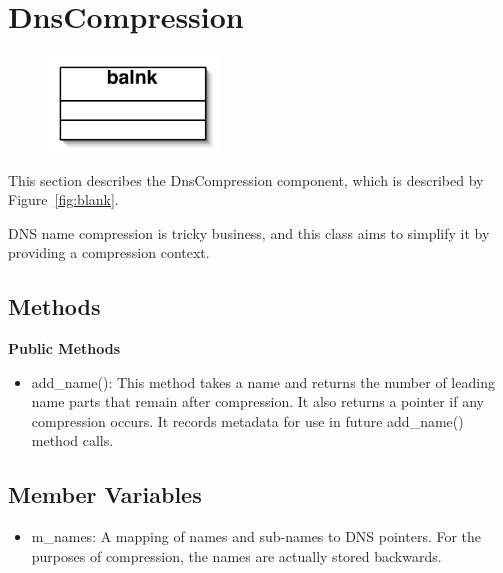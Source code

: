 \section{DnsCompression}\label{sec:dnscomp}

\begin{figure}
\begin{center}
\includegraphics[width=0.4\textwidth]{figs/blank}
\end{center}
\caption{}
\label{fig:dnscomp}
\end{figure}

This section describes the DnsCompression component, which is described by Figure~\ref{fig:blank}.

DNS name compression is tricky business, and this class aims to simplify it by providing a compression context.

\subsection{Methods}

{\bf Public Methods}
\begin{itemize}
\item add\_name(): This method takes a name and returns the number of leading name parts that remain after compression. It also returns a pointer if any compression occurs. It records metadata for use in future add\_name() method calls.
\end{itemize}

\subsection{Member Variables}
\begin{itemize}
\item m\_names: A mapping of names and sub-names to DNS pointers. For the purposes of compression, the names are actually stored backwards.
\end{itemize}
